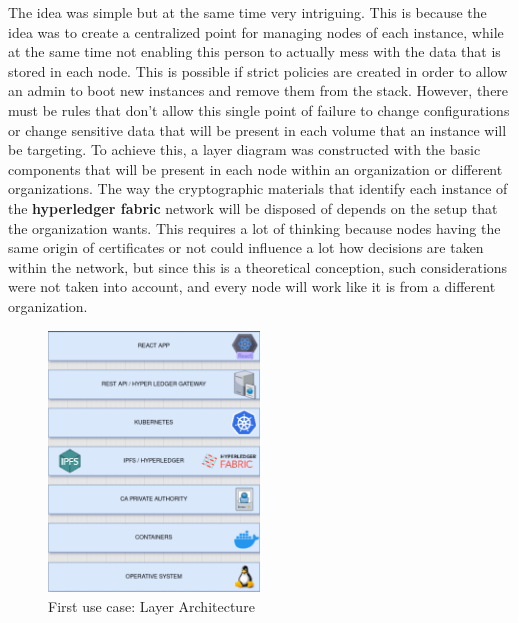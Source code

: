 The idea was simple but at the same time very intriguing. This is because the idea was to create a centralized point for managing nodes of each instance, while at the same time not enabling this person to actually mess with the data that is stored in each node. This is possible if strict policies are created in order to allow an admin to boot new instances and remove them from the stack. However, there must be rules that don't allow this single point of failure to change configurations or change sensitive data that will be present in each volume that an instance will be targeting. To achieve this, a layer diagram was constructed with the basic components that will be present in each node within an organization or different organizations. The way the cryptographic materials that identify each instance of the \textbf{hyperledger fabric} network will be disposed of depends on the setup that the organization wants. This requires a lot of thinking because nodes having the same origin of certificates or not could influence a lot how decisions are taken within the network, but since this is a theoretical conception, such considerations were not taken into account, and every node will work like it is from a different organization.

\begin{figure}[H]
    \centering
    \includegraphics[width=0.5\textwidth]{assets/use-case-1/Layer.png} %
    \caption{First use case: Layer Architecture}
    \label{fig:sample-image} 
\end{figure}

